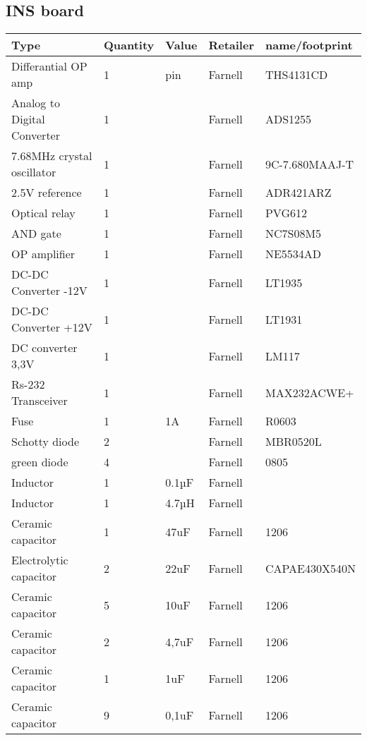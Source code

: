 \subsection{INS board}
\begin{center}
\begin{tabularx}{\textwidth}{|X|l|l|l|l|}
    \hline
   \textbf{Type} & \textbf{Quantity} & \textbf{Value} & \textbf{Retailer} & \textbf{name/footprint} \\ \hline
    Differantial OP amp & 1 &  pin & Farnell & THS4131CD \\ \hline
    Analog to Digital Converter & 1 &  & Farnell & ADS1255 \\ \hline
    7.68MHz crystal oscillator & 1 &  & Farnell & 9C-7.680MAAJ-T \\ \hline
    2.5V reference & 1 &  & Farnell & ADR421ARZ \\ \hline
    Optical relay & 1 &  & Farnell & PVG612 \\ \hline
    AND gate & 1 &  & Farnell & NC7S08M5 \\ \hline
    OP amplifier & 1 &  & Farnell & NE5534AD \\ \hline
    DC-DC Converter -12V & 1 &  & Farnell & LT1935 \\ \hline
    DC-DC Converter +12V & 1 &  & Farnell & LT1931 \\ \hline
    DC converter 3,3V & 1 &  & Farnell & LM117 \\ \hline
    Rs-232 Transceiver & 1 &  & Farnell & MAX232ACWE+ \\ \hline
    Fuse & 1 & 1A & Farnell & R0603\\ \hline
    Schotty diode & 2 &  & Farnell & MBR0520L \\ \hline
    green diode & 4 &  & Farnell & 0805  \\ \hline
    Inductor & 1 & 0.1µF & Farnell &  \\ \hline
    Inductor & 1 & 4.7µH & Farnell &  \\ \hline
    Ceramic capacitor & 1 & 47uF & Farnell & 1206 \\ \hline
    Electrolytic capacitor & 2 & 22uF & Farnell & CAPAE430X540N \\ \hline
    Ceramic capacitor & 5 & 10uF & Farnell & 1206 \\ \hline
    Ceramic capacitor & 2 & 4,7uF & Farnell & 1206 \\ \hline
    Ceramic capacitor & 1 & 1uF & Farnell & 1206 \\ \hline
    Ceramic capacitor & 9 & 0,1uF & Farnell & 1206 \\ \hline

\end{tabularx}
\end{center}
